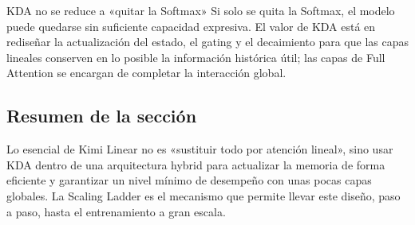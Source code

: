\begin{warningbox}{KDA no se reduce a «quitar la Softmax»}
Si solo se quita la Softmax, el modelo puede quedarse sin suficiente capacidad expresiva. El valor de KDA está en rediseñar la actualización del estado, el gating y el decaimiento para que las capas lineales conserven en lo posible la información histórica útil; las capas de Full Attention se encargan de completar la interacción global.
\end{warningbox}

\subsection{Resumen de la sección}

Lo esencial de Kimi Linear no es «sustituir todo por atención lineal», sino usar KDA dentro de una arquitectura hybrid para actualizar la memoria de forma eficiente y garantizar un nivel mínimo de desempeño con unas pocas capas globales. La Scaling Ladder es el mecanismo que permite llevar este diseño, paso a paso, hasta el entrenamiento a gran escala.
